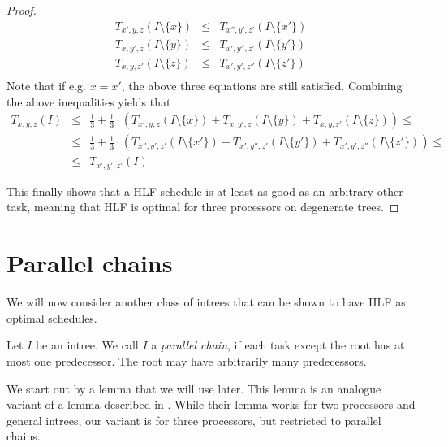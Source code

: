 \begin{proof}
  \begin{eqnarray*}
    T_{x',y,z}(I\setminus\{x\})
    & \leq &
    T_{x'',y',z'}(I\setminus\{x'\}) \\
    T_{x,y',z}(I\setminus\{y\})
    & \leq &
    T_{x',y'',z'}(I\setminus\{y'\}) \\
    T_{x,y,z'}(I\setminus\{z\})
    & \leq &
    T_{x',y',z''}(I\setminus\{z'\}) \\
  \end{eqnarray*}
  Note that if e.g. $x=x'$, the above three equations are still satisfied.
  Combining the above inequalities yields that
  \begin{eqnarray*}
    T_{x,y,z}(I) 
    & \leq & 
    \frac{1}{3} + \frac{1}{3} \cdot 
    \left( 
      T_{x',y,z}(I\setminus\{x\}) +
      T_{x,y',z}(I\setminus\{y\}) +
      T_{x,y,z'}(I\setminus\{z\})
    \right) 
    \leq \\
    & \leq &
    \frac{1}{3} + \frac{1}{3} \cdot 
    \left( 
      T_{x'',y',z'}(I\setminus\{x'\}) +
      T_{x',y'',z'}(I\setminus\{y'\}) +
      T_{x',y',z''}(I\setminus\{z'\})
    \right) \leq \\
    & \leq &
    T_{x',y',z'}(I)
  \end{eqnarray*}

  This finally shows that a HLF schedule is at least as good as an arbitrary other task, meaning that HLF is optimal for three processors on degenerate trees.
\end{proof}

\section{Parallel chains}
\label{sec:p3-parallel-chains}

We will now consider another class of intrees that can be shown to have HLF as optimal schedules.

\begin{definition}
  Let $I$ be an intree. We call $I$ a \emph{parallel chain}, if each task except the root has at most one predecessor. The root may have arbitrarily many predecessors.
\end{definition}


We start out by a lemma that we will use later. This lemma is an analogue variant of a lemma described in \cite{chandyreynoldsshortpaper1975}. While their lemma works for two processors and general intrees, our variant is for three processors, but restricted to parallel chains.

